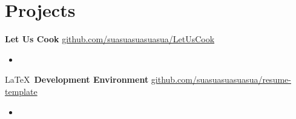 \documentclass[11pt]{article}       %
\begin{document}
\vspace{-6.5pt}

\section*{Projects}
\textbf{Let Us Cook} \hfill \href{https://github.com/suasuasuasuasua/LetUsCook}{github.com/suasuasuasuasua/LetUsCook} \\
\vspace{-9pt}
\begin{itemize}
  \item
\end{itemize}

\LaTeX \, \textbf{Development Environment} \hfill \href{https://github.com/suasuasuasuasua/resume-template}{github.com/suasuasuasuasua/resume-template} \\
\vspace{-9pt}
\begin{itemize}
  \item
\end{itemize}
\end{document}
